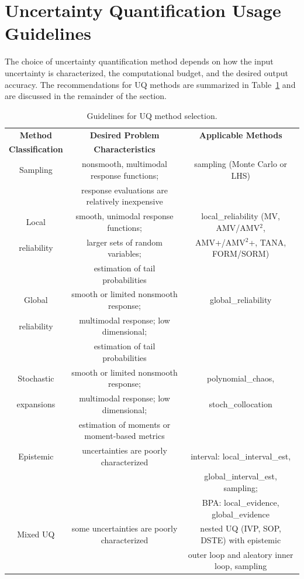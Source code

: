 \section{Uncertainty Quantification Usage Guidelines }\label{usage:uq}

The choice of uncertainty quantification method depends on how the
input uncertainty is characterized, the computational budget, and the
desired output accuracy.  The recommendations for UQ methods are
summarized in Table~\ref{usage:guideuq} and are discussed in the
remainder of the section.

\begin{table}[hbp]
\centering
\caption{Guidelines for UQ method selection.} \label{usage:guideuq}\vspace{2mm}
\begin{tabular}{|c|c|c|}
\hline
\textbf{Method} & \textbf{Desired Problem} & \textbf{Applicable Methods} \\
\textbf{Classification} & \textbf{Characteristics} & \\
\hline
Sampling & nonsmooth, multimodal response functions;       & sampling 
(Monte Carlo or LHS) \\
         & response evaluations are relatively inexpensive & \\
\hline
Local       & smooth, unimodal response functions; & local\_reliability
(MV, AMV/AMV$^2$,\\
reliability & larger sets of random variables;     & AMV+/AMV$^2$+, TANA, 
FORM/SORM) \\
            & estimation of tail probabilities     & \\
\hline
Global      & smooth or limited nonsmooth response; & global\_reliability \\
reliability & multimodal response; low dimensional; & \\
            & estimation of tail probabilities      & \\
\hline
Stochastic & smooth or limited nonsmooth response; & polynomial\_chaos, \\
expansions & multimodal response; low dimensional; & stoch\_collocation\\
           & estimation of moments or moment-based metrics & \\
\hline
Epistemic & uncertainties are poorly characterized &
interval: local\_interval\_est, \\
 & & global\_interval\_est, sampling; \\
 & & BPA: local\_evidence, global\_evidence \\
\hline
Mixed UQ  & some uncertainties are poorly characterized &
nested UQ (IVP, SOP, DSTE) with epistemic \\
 & & outer loop and aleatory inner loop, sampling \\
\hline
\end{tabular}
\end{table}


